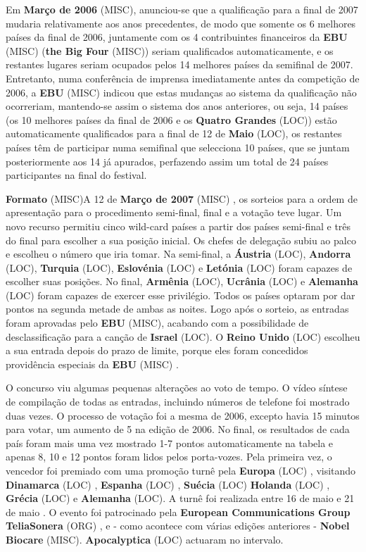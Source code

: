 \documentclass[12pt,a4paper]{article}
\begin{document}
Em \textbf{Março de 2006} (MISC), anunciou-se que a qualificação para a final de 2007 mudaria relativamente aos anos precedentes, de modo que somente os 6 melhores países da final de 2006, juntamente com os 4 contribuintes financeiros da \textbf{EBU} (MISC) (\textbf{the Big Four} (MISC)) seriam qualificados automaticamente, e os restantes lugares seriam ocupados pelos 14 melhores países da semifinal de 2007. Entretanto, numa conferência de imprensa imediatamente antes da competição de 2006, a \textbf{EBU} (MISC) indicou que estas mudanças ao sistema da qualificação não ocorreriam, mantendo-se assim o sistema dos anos anteriores, ou seja, 14 países (os 10 melhores países da final de 2006 e os \textbf{Quatro Grandes} (LOC)) estão automaticamente qualificados para a final de 12 de \textbf{Maio} (LOC), os restantes países têm de participar numa semifinal que selecciona 10 países, que se juntam posteriormente aos 14 já apurados, perfazendo assim um total de 24 países participantes na final do festival.



\textbf{Formato} (MISC)A 12 de \textbf{Março de 2007} (MISC) , os sorteios para a ordem de apresentação para o procedimento semi-final, final e a votação teve lugar. Um novo recurso permitiu cinco wild-card países a partir dos países semi-final e três do final para escolher a sua posição inicial. Os chefes de delegação subiu ao palco e escolheu o número que iria tomar. Na semi-final, a \textbf{Áustria} (LOC), \textbf{Andorra} (LOC), \textbf{Turquia} (LOC), \textbf{Eslovénia} (LOC) e \textbf{Letónia} (LOC) foram capazes de escolher suas posições. No final, \textbf{Armênia} (LOC), \textbf{Ucrânia} (LOC) e \textbf{Alemanha} (LOC) foram capazes de exercer esse privilégio. Todos os países optaram por dar pontos na segunda metade de ambas as noites. Logo após o sorteio, as entradas foram aprovadas pelo \textbf{EBU} (MISC), acabando com a possibilidade de desclassificação para a canção de \textbf{Israel} (LOC). O \textbf{Reino Unido} (LOC) escolheu a sua entrada depois do prazo de limite, porque eles foram concedidos providência especiais da \textbf{EBU} (MISC) .

O concurso viu algumas pequenas alterações ao voto de tempo. O vídeo síntese de compilação de todas as entradas, incluindo números de telefone foi mostrado duas vezes. O processo de votação foi a mesma de 2006, excepto havia 15 minutos para votar, um aumento de 5 na edição de 2006. No final, os resultados de cada país foram mais uma vez mostrado 1-7 pontos automaticamente na tabela e apenas 8, 10 e 12 pontos foram lidos pelos porta-vozes. Pela primeira vez, o vencedor foi premiado com uma promoção turnê pela \textbf{Europa} (LOC) , visitando \textbf{Dinamarca} (LOC) , \textbf{Espanha} (LOC) , \textbf{Suécia} (LOC) \textbf{Holanda} (LOC) , \textbf{Grécia} (LOC) e \textbf{Alemanha} (LOC). A turnê foi realizada entre 16 de maio e 21 de maio . O evento foi patrocinado pela \textbf{European Communications Group TeliaSonera} (ORG) , e - como acontece com várias edições anteriores - \textbf{Nobel Biocare} (MISC). \textbf{Apocalyptica} (LOC) actuaram no intervalo.
\end{document}
